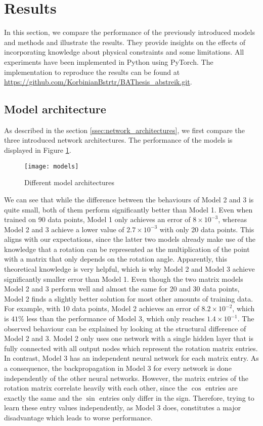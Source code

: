 
\section{Results}
\label{section:results}
In this section, we compare the performance of the previously introduced models and methods and illustrate the results. They provide insights on the effects of incorporating knowledge about physical constraints and some limitations. All experiments have been implemented in Python using PyTorch. The implementation to reproduce the results can be found at \href{https://github.com/KorbinianBstrtr/BAThesis_abstreik.git}{https://github.com/KorbinianBstrtr/BAThesis\_abstreik.git}.

\subsection{Model architecture}
As described in the section \ref{ssec:network_architectures}, we first compare the three introduced network architectures. The performance of the models is displayed in Figure \ref{fig:models}.
\begin{figure}[H]
	\centering
	\texttt{[image: models]}
	\caption{Different model architectures}
	\label{fig:models}
\end{figure}
We can see that while the difference between the behaviours of Model 2 and 3 is quite small, both of them perform significantly better than Model 1. Even when trained on 90 data points, Model 1 only achieves an error of $8\times 10^{-3}$, whereas Model 2 and 3 achieve a lower value of $2.7\times 10^{-3}$ with only 20 data points. This aligns with our expectations, since the latter two models already make use of the knowledge that a rotation can be represented as the multiplication of the point with a matrix that only depends on the rotation angle. Apparently, this theoretical knowledge is very helpful, which is why Model 2 and Model 3 achieve significantly smaller error than Model 1. Even though the two matrix models Model 2 and 3 perform well and almost the same for 20 and 30 data points, Model 2 finds a slightly better solution for most other amounts of training data. For example, with 10 data points, Model 2 achieves an error of $8.2\times 10^{-2}$, which is $41\%$ less than the performance of Model 3, which only reaches $1.4\times 10^{-1}$. The observed behaviour can be explained by looking at the structural difference of Model 2 and 3. Model 2 only uses one network with a single hidden layer that is fully connected with all output nodes which represent the rotation matrix entries. In contrast, Model 3 has an independent neural network for each matrix entry. As a consequence, the backpropagation in Model 3 for every network is done independently of the other neural networks. However, the matrix entries of the rotation matrix correlate heavily with each other, since the $\cos$ entries are exactly the same and the $\sin$ entries only differ in the sign. Therefore, trying to learn these entry values independently, as Model 3 does, constitutes a major disadvantage which leads to worse performance. \\

